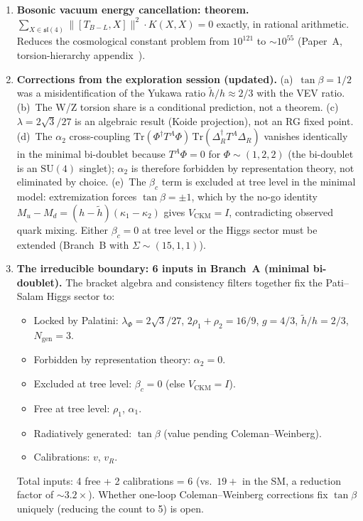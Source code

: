 \documentclass[11pt,a4paper]{article}
\theoremstyle{plain}
\theoremstyle{definition}
\theoremstyle{remark}
\begin{document}
\begin{enumerate}[label=(\arabic*)]
  \item \textbf{Bosonic vacuum energy cancellation: theorem.}
    $\sum_{X \in \mathfrak{sl}(4)} \|[T_{B{-}L}, X]\|^2 \cdot K(X,X) = 0$
    exactly, in rational arithmetic.  Reduces the cosmological constant
    problem from $10^{121}$ to $\sim 10^{55}$ (Paper~A, torsion-hierarchy
    appendix~\cite{Wallace2026a}).

  \item \textbf{Corrections from the exploration session (updated).}
    (a)~$\tan\beta = 1/2$ was a misidentification of the Yukawa ratio
    $\tilde{h}/h \approx 2/3$ with the VEV ratio.
    (b)~The W/Z torsion share is a conditional prediction,
    not a theorem.  (c)~$\lambda = 2\sqrt{3}/27$ is an algebraic result
    (Koide projection), not an RG fixed point.
    (d)~The $\alpha_2$ cross-coupling
    $\mathrm{Tr}(\Phi^\dagger T^A \Phi)\,\mathrm{Tr}(\Delta_R^\dagger T^A \Delta_R)$
    vanishes identically in the minimal bi-doublet because
    $T^A \Phi = 0$ for $\Phi \sim (1, 2, 2)$ (the bi-doublet is an
    $\mathrm{SU}(4)$ singlet); $\alpha_2$ is therefore forbidden by
    representation theory, not eliminated by choice.
    (e)~The $\beta_c$ term is excluded at tree level in the minimal
    model: extremization forces $\tan\beta = \pm 1$, which by the
    no-go identity
    $M_u - M_d = (h - \tilde{h})(\kappa_1 - \kappa_2)$ gives
    $V_{\mathrm{CKM}} = I$, contradicting observed quark mixing.
    Either $\beta_c = 0$ at tree level or the Higgs sector must be
    extended (Branch~B with $\Sigma \sim (15, 1, 1)$).

  \item \textbf{The irreducible boundary: 6 inputs in Branch~A
    (minimal bi-doublet).}
    The bracket algebra and consistency filters together fix the
    Pati--Salam Higgs sector to:
    \begin{itemize}[noitemsep]
      \item Locked by Palatini: $\lambda_\Phi = 2\sqrt{3}/27$,
        $2\rho_1 + \rho_2 = 16/9$, $g = 4/3$, $\tilde{h}/h = 2/3$,
        $N_{\mathrm{gen}} = 3$.
      \item Forbidden by representation theory: $\alpha_2 = 0$.
      \item Excluded at tree level: $\beta_c = 0$ (else $V_{\mathrm{CKM}} = I$).
      \item Free at tree level: $\rho_1$, $\alpha_1$.
      \item Radiatively generated: $\tan\beta$ (value pending Coleman--Weinberg).
      \item Calibrations: $v$, $v_R$.
    \end{itemize}
    Total inputs: 4 free + 2 calibrations = 6 (vs.\ $19{+}$ in the SM,
    a reduction factor of $\sim 3.2\times$).  Whether one-loop
    Coleman--Weinberg corrections fix $\tan\beta$ uniquely (reducing
    the count to 5) is open.


\end{enumerate}
\end{document}
